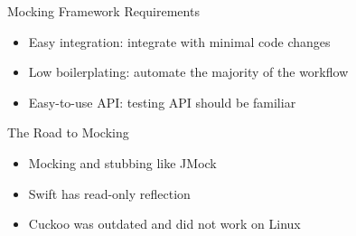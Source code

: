 \documentclass[aspectratio=169]{beamer}
\begin{document}
\begin{frame}{Mocking Framework Requirements}
\begin{itemize}
    \item Easy integration: integrate with minimal code changes
    \item Low boilerplating: automate the majority of the workflow
    \item Easy-to-use API: testing API should be familiar
\end{itemize}
\end{frame}

\begin{frame}{The Road to Mocking}
\begin{center}
    \begin{itemize}
        \item Mocking and stubbing like JMock
        \item Swift has read-only reflection
        \item Cuckoo was outdated and did not work on Linux
    \end{itemize}
\end{center}
\end{frame}
\end{document}

